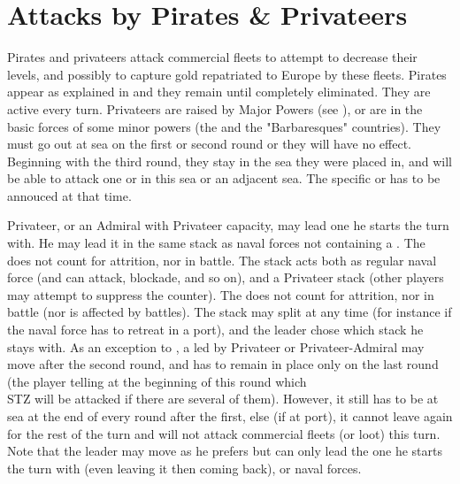 \section{Attacks by Pirates \& Privateers}\label{chRedep:CorsairAttack}

\begin{todo}
\aparag Pirates and privateers attack commercial fleets to attempt to decrease
their levels, and possibly to capture gold repatriated to Europe by these
fleets.
\bparag[Pirates] Pirates appear as explained in  and
they remain until completely eliminated. They are active every turn.
\bparag[Privateers]
\label{chRedep:CorsairAttack Privateer}
Privateers are raised by Major Powers (see ), or are in the basic forces of some minor powers (the
 and the "Barbaresques" countries). They must go out at sea
on the first or second round or they will have no effect.
\bparag Beginning with the third round, they stay in the sea they were placed
in, and will be able to attack one \STZ or \CTZ in this sea or an adjacent
sea. The specific \STZ or \CTZ has to be annouced at that time.  
\end{todo}

\begin{todo}
\label{chSpecific:Raiding
  Privateer admirals}
Privateer, or an Admiral with Privateer capacity, may lead one \corsaire he
starts the turn with.  He may lead it in the same stack as naval forces not
containing a \FLEET.  The \corsaire does not count for attrition, nor in
battle.  The stack acts both as regular naval force (and can attack, blockade,
and so on), and a Privateer stack (other players may attempt to suppress the
\corsaire counter).  The \corsaire does not count for attrition, nor in battle
(nor is affected by battles).  The stack may split at any time (for instance
if the naval force has to retreat in a port), and the leader chose which stack
he stays with.
\bparag As an exception to , a
\corsaire led by Privateer or Privateer-Admiral may move after the second
round, and has to remain in place only on the last round (the player telling
at the beginning of this round which \CTZ\\STZ will be attacked if there are
several of them). However, it still has to be at sea at the end of every round
after the first, else (if at port), it cannot leave again for the rest of the
turn and will not attack commercial fleets (or loot) this turn.
\bparag Note that the leader may move as he prefers but can only lead the one
\corsaire he starts the turn with (even leaving it then coming back), or naval
forces.
\end{todo}

